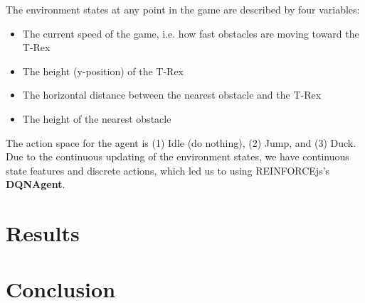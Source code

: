 \documentclass{scrartcl}
\begin{document}
    The environment states at any point in the game are described by four variables:
    \begin{itemize}
        \item The current speed of the game, i.e. how fast obstacles are moving toward the T-Rex
        \item The height (y-position) of the T-Rex
        \item The horizontal distance between the nearest obstacle and the T-Rex
        \item The height of the nearest obstacle
    \end{itemize}

    The action space for the agent is (1) Idle (do nothing), (2) Jump, and (3) Duck. Due to the continuous updating of the environment states, we have continuous state features and discrete actions, which led us to using REINFORCEjs's \textbf{DQNAgent}.

\section{Results}

\section{Conclusion}
\end{document}
